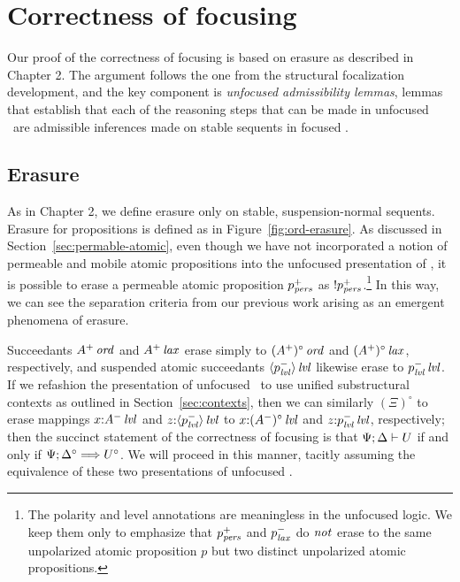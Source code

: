 \section{Correctness of focusing}
\label{sec:ord-correctness}

Our proof of the correctness of focusing is based on erasure as
described in Chapter 2. The argument follows the one from the
structural focalization development, and the key component is {\it
  unfocused admissibility lemmas}, lemmas that establish that each of
the reasoning steps that can be made in unfocused \ollll~are
admissible inferences made on stable sequents in focused \ollll.



\subsection{Erasure}

As in Chapter 2, we define erasure only on stable, suspension-normal
sequents. Erasure for propositions is defined as in
Figure~\ref{fig:ord-erasure}. As discussed in
Section~\ref{sec:permable-atomic}, even though we have not
incorporated a notion of permeable and mobile atomic propositions into
the unfocused presentation of \ollll, it is possible to erase a
permeable atomic proposition $p^+_{\it pers}$ as
${!}p^+_{\it pers}$.\footnote{The polarity and level annotations are
  meaningless in the unfocused logic. We keep them only to emphasize
  that $p^+_{\it pers}$ and $p^-_{\it lax}$ do $\it not$ erase to the same
  unpolarized atomic proposition $p$ but two distinct unpolarized
  atomic propositions.}  In this way, we can see the separation
criteria from our previous work
\cite{simmons08linear,pfenning09substructural} arising as an emergent
phenomena of erasure.

Succeedants ${A^+}\,{{\it ord}}$ and ${A^+}\,{{\it lax}}$ erase simply to 
${(A^+)^\circ}\,{{\it ord}}$ and ${(A^+)^\circ}\,{{\it lax}}$, respectively, and
suspended atomic succeedants ${\langle {p^-_{\it lvl}} \rangle}\,{{\it lvl}}$ likewise erase
to ${p^-_{\it lvl}}\,{{\it lvl}}$. If we refashion the presentation of 
unfocused \ollll~to
use unified substructural contexts as outlined in Section~\ref{sec:contexts},
then we can similarly $(\Xi)^\circ$ to erase mappings
$x{:}{A^-}\,{{\it lvl}}$ and $z{:}{\langle {p^-_{\it lvl}} \rangle}\,{{\it lvl}}$ to 
$x{:}{(A^-)^\circ}\,{{\it lvl}}$ and $z{:}{p^-_{\it lvl}}\,{{\it lvl}}$, respectively;
then the succinct statement of the correctness of focusing is that
${\Psi};{\Delta} \vdash {U}$ if and only if 
$\Psi; \Delta^\circ \Longrightarrow U^\circ$. We will proceed in this manner,
tacitly assuming the equivalence of these two presentations of
unfocused \ollll.


